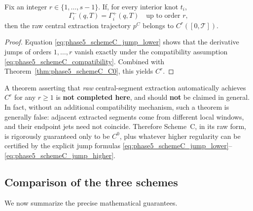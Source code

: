 \begin{proposition}
\label{prop:phase5_schemeC_sufficient}
Fix an integer \(r\in\{1,\dots,s-1\}\).
If, for every interior knot \(t_i\),
\begin{equation}
\label{eq:phase5_schemeC_compatibility}
\Gamma_i^{-}(q,T)=\Gamma_i^{+}(q,T)
\quad\text{up to order }r,
\end{equation}
then the raw central extraction trajectory \(p^C\) belongs to \(C^r([0,\mathcal T])\).
\end{proposition}

\begin{proof}
Equation \eqref{eq:phase5_schemeC_jump_lower} shows that the derivative jumps of orders \(1,\dots,r\) vanish exactly under the compatibility assumption \eqref{eq:phase5_schemeC_compatibility}.
Combined with Theorem~\ref{thm:phase5_schemeC_C0}, this yields \(C^r\).
\end{proof}

\begin{remark}
\label{rem:phase5_schemeC_limitation}
A theorem asserting that \emph{raw} central-segment extraction automatically achieves \(C^r\) for any \(r\ge 1\) is \textbf{not completed here}, and should \textbf{not} be claimed in general.
In fact, without an additional compatibility mechanism, such a theorem is generally false:
adjacent extracted segments come from different local windows, and their endpoint jets need not coincide.
Therefore Scheme~C, in its raw form, is rigorously guaranteed only to be \(C^0\), plus whatever higher regularity can be certified by the explicit jump formulas \eqref{eq:phase5_schemeC_jump_lower}--\eqref{eq:phase5_schemeC_jump_higher}.
\end{remark}

\subsection{Comparison of the three schemes}
\label{subsec:phase5_comparison}

We now summarize the precise mathematical guarantees.

